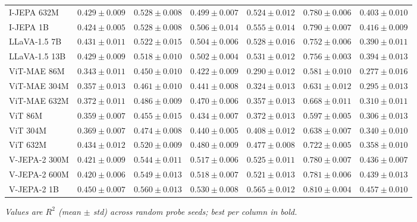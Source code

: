 \begin{table}[t]
{\begin{tabular}{lcccccc}
I-JEPA 632M & $0.429 \pm 0.009$ & $0.528 \pm 0.008$ & $0.499 \pm 0.007$ & $0.524 \pm 0.012$ & $0.780 \pm 0.006$ & $0.403 \pm 0.010$ \\
I-JEPA 1B & $0.424 \pm 0.005$ & $0.528 \pm 0.008$ & $0.506 \pm 0.014$ & $0.555 \pm 0.014$ & $0.790 \pm 0.007$ & $0.416 \pm 0.009$ \\
LLaVA-1.5 7B & $0.431 \pm 0.011$ & $0.522 \pm 0.015$ & $0.504 \pm 0.006$ & $0.528 \pm 0.016$ & $0.752 \pm 0.006$ & $0.390 \pm 0.011$ \\
LLaVA-1.5 13B & $0.429 \pm 0.009$ & $0.518 \pm 0.010$ & $0.502 \pm 0.004$ & $0.531 \pm 0.012$ & $0.756 \pm 0.003$ & $0.394 \pm 0.013$ \\
ViT-MAE 86M & $0.343 \pm 0.011$ & $0.450 \pm 0.010$ & $0.422 \pm 0.009$ & $0.290 \pm 0.012$ & $0.581 \pm 0.010$ & $0.277 \pm 0.016$ \\
ViT-MAE 304M & $0.357 \pm 0.013$ & $0.461 \pm 0.010$ & $0.441 \pm 0.008$ & $0.324 \pm 0.013$ & $0.631 \pm 0.012$ & $0.295 \pm 0.013$ \\
ViT-MAE 632M & $0.372 \pm 0.011$ & $0.486 \pm 0.009$ & $0.470 \pm 0.006$ & $0.357 \pm 0.013$ & $0.668 \pm 0.011$ & $0.310 \pm 0.011$ \\
ViT 86M & $0.359 \pm 0.007$ & $0.455 \pm 0.015$ & $0.434 \pm 0.007$ & $0.372 \pm 0.013$ & $0.597 \pm 0.005$ & $0.306 \pm 0.013$ \\
ViT 304M & $0.369 \pm 0.007$ & $0.474 \pm 0.008$ & $0.440 \pm 0.005$ & $0.408 \pm 0.012$ & $0.638 \pm 0.007$ & $0.340 \pm 0.010$ \\
ViT 632M & $0.434 \pm 0.012$ & $0.520 \pm 0.009$ & $0.480 \pm 0.009$ & $0.477 \pm 0.008$ & $0.722 \pm 0.005$ & $0.358 \pm 0.010$ \\
V-JEPA-2 300M & $0.421 \pm 0.009$ & $0.544 \pm 0.011$ & $0.517 \pm 0.006$ & $0.525 \pm 0.011$ & $0.780 \pm 0.007$ & $0.436 \pm 0.007$ \\
V-JEPA-2 600M & $0.420 \pm 0.006$ & $0.549 \pm 0.013$ & $0.518 \pm 0.007$ & $0.521 \pm 0.013$ & $0.781 \pm 0.006$ & $0.439 \pm 0.013$ \\
V-JEPA-2 1B & $0.450 \pm 0.007$ & $0.560 \pm 0.013$ & $0.530 \pm 0.008$ & $0.565 \pm 0.012$ & $0.810 \pm 0.004$ & $0.457 \pm 0.010$ \\
\bottomrule
\end{tabular}
}
\par\smallskip\textit{Values are $R^2$ (mean $\pm$ std) across random probe seeds; best per column in bold.}
\end{table}
